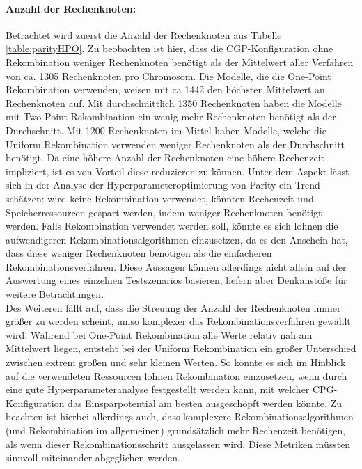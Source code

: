 \paragraph{Anzahl der Rechenknoten:}
Betrachtet wird zuerst die Anzahl der Rechenknoten aus Tabelle \ref{table:parityHPO}. 
Zu beobachten ist hier, dass die CGP-Konfiguration ohne Rekombination weniger Rechenknoten benötigt als der Mittelwert aller Verfahren von ca. 1305 Rechenknoten pro Chromosom.
Die Modelle, die die One-Point Rekombination verwenden, weisen mit ca 1442 den höchsten Mittelwert an Rechenknoten auf.
Mit durchschnittlich 1350 Rechenknoten haben die Modelle mit Two-Point Rekombination ein wenig mehr Rechenknoten benötigt als der Durchschnitt.
Mit 1200 Rechenknoten im Mittel haben Modelle, welche die Uniform Rekombination verwenden weniger Rechenknoten als der Durchschnitt benötigt.
Da eine höhere Anzahl der Rechenknoten eine höhere Rechenzeit impliziert, ist es von Vorteil diese reduzieren zu können.
Unter dem Aspekt lässt sich in der Analyse der Hyperparameteroptimierung von Parity ein Trend schätzen: wird keine Rekombination verwendet, könnten Rechenzeit und Speicherressourcen gespart werden, indem weniger Rechenknoten benötigt werden. 
Falls Rekombination verwendet werden soll, könnte es sich lohnen die aufwendigeren Rekombinationsalgorithmen einzusetzen, da es den Anschein hat, dass diese weniger Rechenknoten benötigen als die einfacheren Rekombinationsverfahren.
Diese Aussagen können allerdings nicht allein auf der Auswertung eines einzelnen Testszenarios basieren, liefern aber Denkanstöße für weitere Betrachtungen.\\
Des Weiteren fällt auf, dass die Streuung der Anzahl der Rechenknoten immer größer zu werden scheint, umso komplexer das Rekombinationsverfahren gewählt wird. 
Während bei One-Point Rekombination alle Werte relativ nah am Mittelwert liegen, entsteht bei der Uniform Rekombination ein großer Unterschied zwischen extrem großen und sehr kleinen Werten. 
So könnte es sich im Hinblick auf die verwendeten Ressourcen lohnen Rekombination einzusetzen, wenn durch eine gute Hyperparameteranalyse festgestellt werden kann, mit welcher CPG-Konfiguration das Einsparpotential am besten ausgeschöpft werden könnte.
Zu beachten ist hierbei allerdings auch, dass komplexere Rekombinationsalgorithmen (und Rekombination im allgemeinen) grundsätzlich mehr Rechenzeit benötigen, als wenn dieser Rekombinationsschritt ausgelassen wird.
Diese Metriken müssten sinnvoll miteinander abgeglichen werden.
